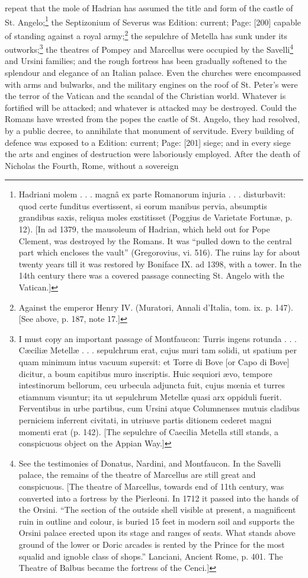 repeat that the mole of Hadrian has assumed the title and form of the castle of St. Angelo;\footnote{Hadriani molem . . . magnâ ex parte Romanorum injuria . . . disturbavit: quod certe funditus evertissent, si eorum manibus pervia, absumptis grandibus saxis, reliqua moles exstitisset (Poggius de Varietate Fortunæ, p. 12). [In ad 1379, the mausoleum of Hadrian, which held out for Pope Clement, was destroyed by the Romans. It was \texthebrew{“}pulled down to the central part which encloses the vault\texthebrew{}” (Gregorovius, vi. 516). The ruins lay for about twenty years till it was restored by Boniface IX. ad 1398, with a tower. In the 14th century there was a covered passage connecting St. Angelo with the Vatican.]} the Septizonium of Severus was Edition: current; Page: [200] capable of standing against a royal army;\footnote{Against the emperor Henry IV. (Muratori, Annali d\texthebrew{}’Italia, tom. ix. p. 147). [See above, p. 187, note 17.]} the sepulchre of Metella has sunk under its outworks;\footnote{I must copy an important passage of Montfaucon: Turris ingens rotunda . . . Cæciliæ Metellæ . . . sepulchrum erat, cujus muri tam solidi, ut spatium per quam minimum intus vacuum supersit: et Torre di Bove [or Capo di Bove] dicitur, a boum capitibus muro inscriptis. Huic sequiori ævo, tempore intestinorum bellorum, ceu urbecula adjuncta fuit, cujus mœnia et turres etiamnum visuntur; ita ut sepulchrum Metellæ quasi arx oppiduli fuerit. Ferventibus in urbe partibus, cum Ursini atque Columnenses mutuis cladibus perniciem inferrent civitati, in utriusve partis ditionem cederet magni momenti erat (p. 142). [The sepulchre of Caecilia Metella still stands, a conspicuous object on the Appian Way.]} the theatres of Pompey and Marcellus were occupied by the Savelli\footnote{See the testimonies of Donatus, Nardini, and Montfaucon. In the Savelli palace, the remains of the theatre of Marcellus are still great and conspicuous. [The theatre of Marcellus, towards end of 11th century, was converted into a fortress by the Pierleoni. In 1712 it passed into the hands of the Orsini. \texthebrew{“}The section of the outside shell visible at present, a magnificent ruin in outline and colour, is buried 15 feet in modern soil and supports the Orsini palace erected upon its stage and ranges of seats. What stands above ground of the lower or Doric arcades is rented by the Prince for the most squalid and ignoble class of shops.\texthebrew{}” Lanciani, Ancient Rome, p. 401. The Theatre of Balbus became the fortress of the Cenci.]} and Ursini families; and the rough fortress has been gradually softened to the splendour and elegance of an Italian palace. Even the churches were encompassed with arms and bulwarks, and the military engines on the roof of St. Peter\texthebrew{}’s were the terror of the Vatican and the scandal of the Christian world. Whatever is fortified will be attacked; and whatever is attacked may be destroyed. Could the Romans have wrested from the popes the castle of St. Angelo, they had resolved, by a public decree, to annihilate that monument of servitude. Every building of defence was exposed to a Edition: current; Page: [201] siege; and in every siege the arts and engines of destruction were laboriously employed. After the death of Nicholas the Fourth, Rome, without a sovereign 